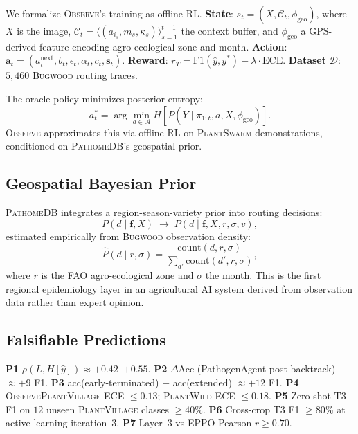 \documentclass[11pt,twocolumn]{article}
\newcommand{\observe}{\textsc{Observe}\xspace}
\newcommand{\plantswarm}{\textsc{PlantSwarm}\xspace}
\newcommand{\pathomedb}{\textsc{PathomeDB}\xspace}
\newcommand{\bugwood}{\textsc{Bugwood}\xspace}
\newcommand{\pv}{\textsc{PlantVillage}\xspace}
\newcommand{\pw}{\textsc{PlantWild}\xspace}
\begin{document}
We formalize \observe's training as offline RL.
\textbf{State}: $s_t{=}(X, \mathcal{C}_t, \phi_\text{geo})$,
where $X$ is the image, $\mathcal{C}_t{=}\langle
(a_{i_s}, m_s, \kappa_s)\rangle_{s=1}^{t-1}$
the context buffer, and $\phi_\text{geo}$ a
GPS-derived feature encoding agro-ecological
zone and month.
\textbf{Action}: $\mathbf{a}_t{=}(a^\text{next}_t,
b_t, \epsilon_t, \alpha_t, c_t, \mathbf{s}_t)$.
\textbf{Reward}: $r_T{=}\text{F1}(\hat{y},y^*)
{-}\lambda{\cdot}\text{ECE}$.
\textbf{Dataset} $\mathcal{D}$: $5{,}460$
\bugwood routing traces.

The oracle policy minimizes posterior entropy:
\begin{equation}
  a^*_t = \arg\min_{a \in \mathcal{A}}
  H[P(Y \mid \pi_{1:t}, a, X, \phi_\text{geo})].
  \label{eq:optimal}
\end{equation}
\observe approximates this via offline RL on
\plantswarm demonstrations, conditioned on
\pathomedb's geospatial prior.

\subsection{Geospatial Bayesian Prior}

\pathomedb integrates a region-season-variety
prior into routing decisions:
\begin{equation}
  P(d \mid \mathbf{f}, X) \;\to\;
  P(d \mid \mathbf{f}, X, r, \sigma, v),
  \label{eq:geoprior}
\end{equation}
estimated empirically from \bugwood
observation density:
\begin{equation}
  \hat{P}(d \mid r, \sigma) =
  \frac{\mathrm{count}(d, r, \sigma)}
       {\sum_{d'} \mathrm{count}(d', r, \sigma)},
  \label{eq:density}
\end{equation}
where $r$ is the FAO agro-ecological zone
and $\sigma$ the month. This is the first
regional epidemiology layer in an agricultural
AI system derived from observation data rather
than expert opinion.

\subsection{Falsifiable Predictions}

\textbf{P1} $\rho(L, H[\hat{y}]) \approx {+}0.42$--${+}0.55$.
\textbf{P2} $\Delta$Acc (PathogenAgent post-backtrack) $\approx{+}9$ F1.
\textbf{P3} acc(early-terminated) $-$ acc(extended) $\approx{+}12$ F1.
\textbf{P4} \observe \pv ECE ${\leq}0.13$; \pw ECE ${\leq}0.18$.
\textbf{P5} Zero-shot T3 F1 on $12$ unseen \pv classes ${\geq}40\%$.
\textbf{P6} Cross-crop T3 F1 ${\geq}80\%$ at active learning iteration~3.
\textbf{P7} Layer~3 vs EPPO Pearson $r{\geq}0.70$.
\end{document}
